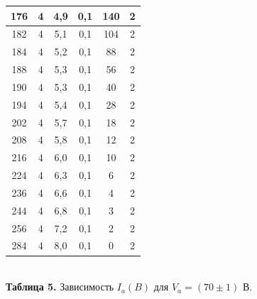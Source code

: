 \documentclass{article}
\begin{document}
\begin{center}
\begin{tabular}{|c|c|c|c|c|c|}
176 & 4 & 4,9 & 0,1 & 140 & 2 \\ \hline
182 & 4 & 5,1 & 0,1 & 104 & 2 \\ \hline
184 & 4 & 5,2 & 0,1 & 88 & 2 \\ \hline
188 & 4 & 5,3 & 0,1 & 56 & 2 \\ \hline
190 & 4 & 5,3 & 0,1 & 40 & 2 \\ \hline
194 & 4 & 5,4 & 0,1 & 28 & 2 \\ \hline
202 & 4 & 5,7 & 0,1 & 18 & 2 \\ \hline
208 & 4 & 5,8 & 0,1 & 12 & 2 \\ \hline
216 & 4 & 6,0 & 0,1 & 10 & 2 \\ \hline
224 & 4 & 6,3 & 0,1 & 6 & 2 \\ \hline
236 & 4 & 6,6 & 0,1 & 4 & 2 \\ \hline
244 & 4 & 6,8 & 0,1 & 3 & 2 \\ \hline
256 & 4 & 7,2 & 0,1 & 2 & 2 \\ \hline
284 & 4 & 8,0 & 0,1 & 0 & 2 \\ \hline
\end{tabular}\\
\textbf{Таблица 5.} Зависимость $I_a(B)$ для $V_a = (70 \pm 1)$ В.
\end{center}
\end{document}
